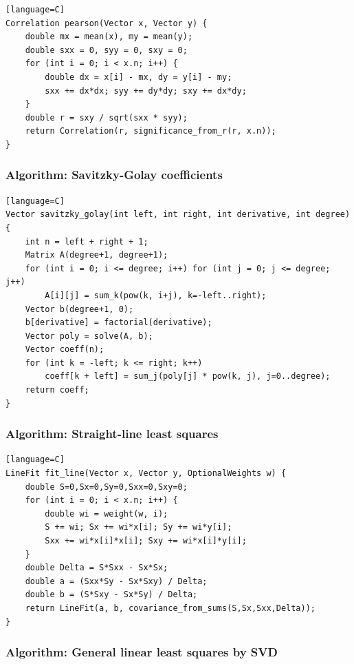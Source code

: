\documentclass[11pt]{article}
\begin{document}
\begin{verbatim}[language=C]
Correlation pearson(Vector x, Vector y) {
    double mx = mean(x), my = mean(y);
    double sxx = 0, syy = 0, sxy = 0;
    for (int i = 0; i < x.n; i++) {
        double dx = x[i] - mx, dy = y[i] - my;
        sxx += dx*dx; syy += dy*dy; sxy += dx*dy;
    }
    double r = sxy / sqrt(sxx * syy);
    return Correlation(r, significance_from_r(r, x.n));
}
\end{verbatim}

\subsubsection{Algorithm: Savitzky-Golay coefficients}\label{algorithm-savitzky-golay-coefficients}

\begin{verbatim}[language=C]
Vector savitzky_golay(int left, int right, int derivative, int degree) {
    int n = left + right + 1;
    Matrix A(degree+1, degree+1);
    for (int i = 0; i <= degree; i++) for (int j = 0; j <= degree; j++)
        A[i][j] = sum_k(pow(k, i+j), k=-left..right);
    Vector b(degree+1, 0);
    b[derivative] = factorial(derivative);
    Vector poly = solve(A, b);
    Vector coeff(n);
    for (int k = -left; k <= right; k++)
        coeff[k + left] = sum_j(poly[j] * pow(k, j), j=0..degree);
    return coeff;
}
\end{verbatim}

\subsubsection{Algorithm: Straight-line least squares}\label{algorithm-straight-line-least-squares}

\begin{verbatim}[language=C]
LineFit fit_line(Vector x, Vector y, OptionalWeights w) {
    double S=0,Sx=0,Sy=0,Sxx=0,Sxy=0;
    for (int i = 0; i < x.n; i++) {
        double wi = weight(w, i);
        S += wi; Sx += wi*x[i]; Sy += wi*y[i];
        Sxx += wi*x[i]*x[i]; Sxy += wi*x[i]*y[i];
    }
    double Delta = S*Sxx - Sx*Sx;
    double a = (Sxx*Sy - Sx*Sxy) / Delta;
    double b = (S*Sxy - Sx*Sy) / Delta;
    return LineFit(a, b, covariance_from_sums(S,Sx,Sxx,Delta));
}
\end{verbatim}

\subsubsection{Algorithm: General linear least squares by SVD}\label{algorithm-general-linear-least-squares-by-svd}
\end{document}
